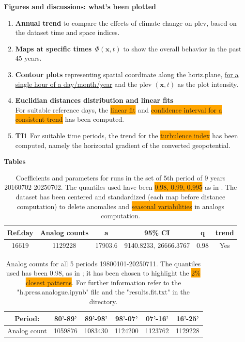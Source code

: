 \documentclass[9pt]{beamer}
\newcommand\Fontvi{\fontsize{6}{7.2}\selectfont}
\newcommand\Fonttab{\fontsize{12}{7.2}\selectfont}
\begin{document}
\begin{frame}[allowframebreaks]{\textbf{Figures and discussions: what's been plotted}}
\Fonttab
\begin{enumerate}
\item \textbf{Annual trend} to compare the effects of climate change on plev, based on the dataset time and space indices.
\item \textbf{Maps at specific times} $\, \Phi(\mathbf{x},t) $ to show the overall behavior in the past 45 years.
\item \textbf{Contour plots} representing spatial coordinate along the horiz.plane, \underline{for a single hour of a day/month/year} and the plev $(\mathbf{x},t)$ as the plot intensity.
\item \textbf{Euclidian distances distribution and linear fits}\\ For suitable reference days, the \colorbox{orange}{linear fit} and \colorbox{orange}{confidence interval for a consistent trend} has been computed.
\item \textbf{TI1} For suitable time periods, the trend for the \colorbox{orange}{turbulence index} has been computed, namely the horizontal gradient of the converted geopotential.
\end{enumerate}
\end{frame}
\begin{frame}[allowframebreaks]{\textbf{Tables}}
\Fontvi
\begin{table}
    \centering
    \begin{tabular}{|c|c|c|c|c|c|}
        \hline
        \textbf{Ref.day} & \textbf{Analog counts}&\textbf{a} & \textbf{95\% CI}
 & q & trend \\
        \hline 
        16619 & 1129228 & 17903.6  & 9140.8233, 26666.3767 & 0.98 & Yes\\
        \hline
    \end{tabular}
    \caption{Coefficients and parameters for runs in the set of 5th period of 9 years 20160702-20250702. The quantiles used have been \colorbox{orange}{0.98, 0.99, 0.995} as in \cite{alberti2024}. The dataset has been centered and standardized (each map before distance computation) to delete anomalies and \colorbox{orange}{seasonal variabilities} in analogs computation.}
    \label{tab:1}
\end{table}

\begin{table}
    \centering
    \begin{tabular}{|c|c|c|c|c|c|}
        \hline
        Period:&80'-89' &89'-98'  & 98'-07' & 07'-16' & 16'-25' \\
        \hline
       Analog count& 1059876& 1083430 &1124200   &1123762 & 1129228  \\
        \hline
    \end{tabular}
    \caption{Analog counts for all 5 periods 19800101-20250711. The quantiles used has been 0.98, as in \cite{alberti2024}; it has been chosen to highlight the \colorbox{orange}{2\% closest patterns}. For further information refer to the "h.press.analogue.ipynb" file and the "results.fit.txt" in the directory.}
    \label{tab:1}
\end{table}
\end{frame}
\end{document}

